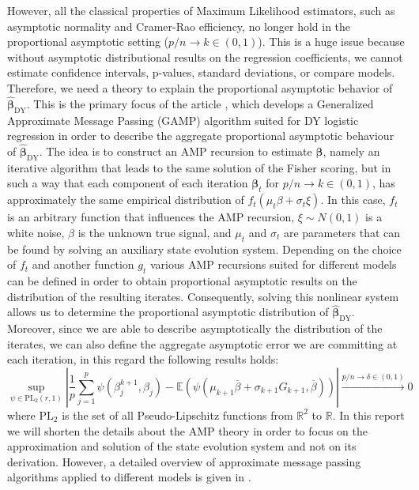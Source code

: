 \documentclass{article}
\begin{document}
\noindent However, all the classical properties of Maximum Likelihood estimators, such as asymptotic normality and Cramer-Rao efficiency,  no longer hold in the proportional asymptotic setting ($p/n\rightarrow k\in(0,1)$). This is a huge issue because without asymptotic distributional results on the regression coefficients, we cannot estimate confidence intervals, p-values, standard deviations, or compare models. Therefore, we need a theory to explain the proportional asymptotic behavior of $\hat{\boldsymbol{\beta}}_{\text{DY}}$. This is the primary focus of the article \citep{DYkosmidis}, which develops a Generalized Approximate Message Passing (GAMP) algorithm suited for DY logistic regression in order to describe the aggregate proportional asymptotic behaviour of $\hat{\boldsymbol{\beta}}_{\text{DY}}$. The idea is to construct an AMP recursion to estimate $\boldsymbol{\beta}$, namely an iterative algorithm that leads to the same solution of the Fisher scoring, but in such a way that each component of each iteration $\boldsymbol{\beta}_t$ for $p/n\rightarrow k\in(0,1)$, has approximately the same empirical distribution of $f_t(\mu_t\beta+\sigma_t\xi)$. In this case, $f_t$ is an arbitrary function that influences the AMP recursion, $\xi\sim N(0,1)$ is a white noise, $\beta$ is the unknown true signal, and $\mu_t$ and $\sigma_t$ are parameters that can be found by solving an auxiliary state evolution system. Depending on the choice of $f_t$ and another function $g_t$ various AMP recursions suited for different models can be defined in order to obtain proportional asymptotic results on the distribution of the resulting iterates.    Consequently, solving this nonlinear system allows us to determine the proportional asymptotic distribution of $\hat{\boldsymbol{\beta}}_{\text{DY}}$. Moreover, since we are able to describe asymptotically the distribution of the iterates, we can also define the aggregate asymptotic error we are committing at each iteration, in this regard the following results holds:
\begin{equation}
\underset{\psi\in\text{PL}_2(r,1)}\sup\left|\frac{1}{p}\overset{p}{\underset{j=1}{\sum}}\psi(\beta_j^{k+1},\beta_j)-\mathbb{E}(\psi(\mu_{k+1}\overline{\beta}+\sigma_{k+1}G_{k+1},\overline{\beta}))\right|\overset{p/n\rightarrow \delta\in(0,1)}{\longrightarrow} 0
\label{asyerr}
\end{equation}
where $\text{PL}_2$ is the set of all Pseudo-Lipschitz functions from $\mathbb{R}^2$ to $\mathbb{R}$. In this report we will shorten the details about the AMP theory in order to focus on the approximation and solution of the state evolution system and not on its derivation. However, a detailed overview of approximate message passing algorithms applied to different models is given in \citep{amptut}.  
\end{document}
